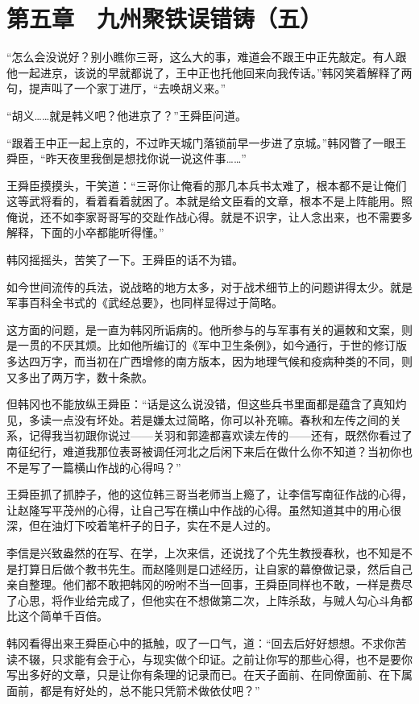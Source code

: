 \section{第五章　九州聚铁误错铸（五）}

“怎么会没说好？别小瞧你三哥，这么大的事，难道会不跟王中正先敲定。有人跟他一起进京，该说的早就都说了，王中正也托他回来向我传话。”韩冈笑着解释了两句，提声叫了一个家丁进厅，“去唤胡义来。”

“胡义……就是韩义吧？他进京了？”王舜臣问道。

“跟着王中正一起上京的，不过昨天城门落锁前早一步进了京城。”韩冈瞥了一眼王舜臣，“昨天夜里我倒是想找你说一说这件事……”

王舜臣摸摸头，干笑道：“三哥你让俺看的那几本兵书太难了，根本都不是让俺们这等武将看的，看着看着就困了。本就是给文臣看的文章，根本不是上阵能用。照俺说，还不如李家哥哥写的交趾作战心得。就是不识字，让人念出来，也不需要多解释，下面的小卒都能听得懂。”

韩冈摇摇头，苦笑了一下。王舜臣的话不为错。

如今世间流传的兵法，说战略的地方太多，对于战术细节上的问题讲得太少。就是军事百科全书式的《武经总要》，也同样显得过于简略。

这方面的问题，是一直为韩冈所诟病的。他所参与的与军事有关的遍敇和文案，则是一贯的不厌其烦。比如他所编订的《军中卫生条例》，如今通行，于世的修订版多达四万字，而当初在广西增修的南方版本，因为地理气候和疫病种类的不同，则又多出了两万字，数十条款。

但韩冈也不能放纵王舜臣：“话是这么说没错，但这些兵书里面都是蕴含了真知灼见，多读一点没有坏处。若是嫌太过简略，你可以补充嘛。春秋和左传之间的关系，记得我当初跟你说过——关羽和郭逵都喜欢读左传的——还有，既然你看过了南征纪行，难道我那位表哥被调任河北之后闲下来后在做什么你不知道？当初你也不是写了一篇横山作战的心得吗？”

王舜臣抓了抓脖子，他的这位韩三哥当老师当上瘾了，让李信写南征作战的心得，让赵隆写平茂州的心得，让自己写在横山中作战的心得。虽然知道其中的用心很深，但在油灯下咬着笔杆子的日子，实在不是人过的。

李信是兴致盎然的在写、在学，上次来信，还说找了个先生教授春秋，也不知是不是打算日后做个教书先生。而赵隆则是口述经历，让自家的幕僚做记录，然后自己亲自整理。他们都不敢把韩冈的吩咐不当一回事，王舜臣同样也不敢，一样是费尽了心思，将作业给完成了，但他实在不想做第二次，上阵杀敌，与贼人勾心斗角都比这个简单千百倍。

韩冈看得出来王舜臣心中的抵触，叹了一口气，道：“回去后好好想想。不求你苦读不辍，只求能有会于心，与现实做个印证。之前让你写的那些心得，也不是要你写出多好的文章，只是让你有条理的记录而已。在天子面前、在同僚面前、在下属面前，都是有好处的，总不能只凭箭术做依仗吧？”

